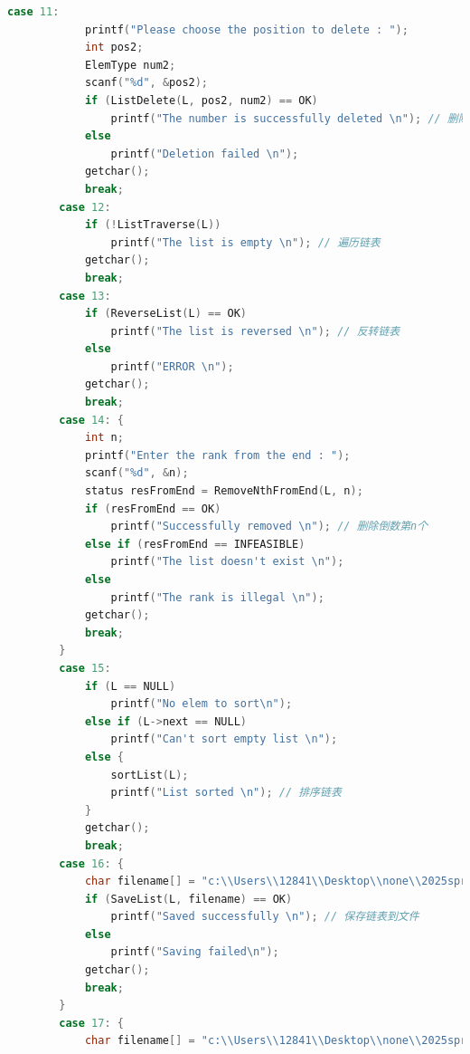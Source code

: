 \documentclass[supercite]{Experimental_Report}
\theoremstyle{definition}
\begin{document}
\begin{lstlisting}[language=c]
        case 11:
            printf("Please choose the position to delete : ");
            int pos2;
            ElemType num2;
            scanf("%d", &pos2);
            if (ListDelete(L, pos2, num2) == OK)
                printf("The number is successfully deleted \n"); // 删除元素
            else
                printf("Deletion failed \n");
            getchar();
            break;
        case 12:
            if (!ListTraverse(L))
                printf("The list is empty \n"); // 遍历链表
            getchar();
            break;
        case 13:
            if (ReverseList(L) == OK)
                printf("The list is reversed \n"); // 反转链表
            else
                printf("ERROR \n");
            getchar();
            break;
        case 14: {
            int n;
            printf("Enter the rank from the end : ");
            scanf("%d", &n);
            status resFromEnd = RemoveNthFromEnd(L, n);
            if (resFromEnd == OK)
                printf("Successfully removed \n"); // 删除倒数第n个
            else if (resFromEnd == INFEASIBLE)
                printf("The list doesn't exist \n");
            else
                printf("The rank is illegal \n");
            getchar();
            break;
        }
        case 15:
            if (L == NULL)
                printf("No elem to sort\n");
            else if (L->next == NULL)
                printf("Can't sort empty list \n");
            else {
                sortList(L);
                printf("List sorted \n"); // 排序链表
            }
            getchar();
            break;
        case 16: {
            char filename[] = "c:\\Users\\12841\\Desktop\\none\\2025springDS\\experiments\\ex2\\list2.txt";
            if (SaveList(L, filename) == OK)
                printf("Saved successfully \n"); // 保存链表到文件
            else
                printf("Saving failed\n");
            getchar();
            break;
        }
        case 17: {
            char filename[] = "c:\\Users\\12841\\Desktop\\none\\2025springDS\\experiments\\ex2\\list2.txt";

\end{lstlisting}
\end{document}
